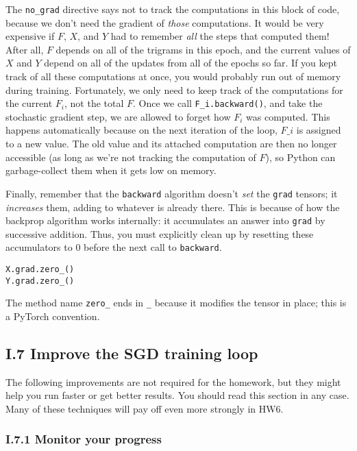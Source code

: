 The \texttt{no\_grad} directive says not to track the computations in this block of code, because we don’t need the gradient of \textit{those} computations. It would be very expensive if $F$, $X$, and $Y$ had to remember \textit{all} the steps that computed them! After all, $F$ depends on all of the trigrams in this epoch, and the current values of $X$ and $Y$ depend on all of the updates from all of the epochs so far. If you kept track of all these computations at once, you would probably run out of memory during training. Fortunately, we only need to keep track of the computations for the current $F_i$, not the total $F$. Once we call \texttt{F\_i.backward()}, and take the stochastic gradient step, we are allowed to forget how $F_i$ was computed. This happens automatically because on the next iteration of the loop, $F\_i$ is assigned to a new value. The old value and its attached computation are then no longer accessible (as long as we’re not tracking the computation of $F$), so Python can garbage-collect them when it gets low on memory.

Finally, remember that the \texttt{backward} algorithm doesn’t \textit{set} the \texttt{grad} tensors; it \textit{increases} them, adding to whatever is already there. This is because of how the backprop algorithm works internally: it accumulates an answer into \texttt{grad} by successive addition. Thus, you must explicitly clean up by resetting these accumulators to 0 before the next call to \texttt{backward}.
\begin{verbatim}
X.grad.zero_()
Y.grad.zero_()
\end{verbatim}

The method name \texttt{zero\_} ends in \texttt{\_} because it modifies the tensor in place; this is a PyTorch convention.

\subsection*{I.7 Improve the SGD training loop}

The following improvements are not required for the homework, but they might help you run faster or get better results. You should read this section in any case. Many of these techniques will pay off even more strongly in HW6.

\subsubsection*{I.7.1 Monitor your progress}

